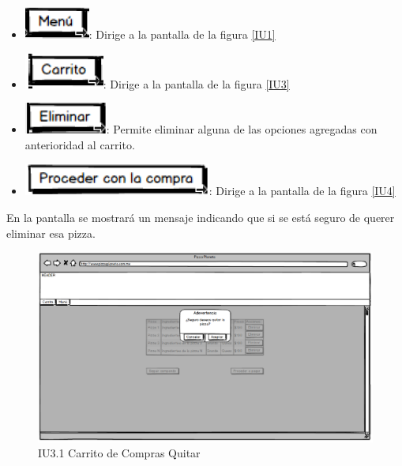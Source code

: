 \begin{itemize}
	
	\item \includegraphics[scale=0.500]{imagenes/iconografia/Menu.png}: Dirige a la pantalla de la figura \ref{IU1}
	\item \includegraphics[scale=0.500]{imagenes/iconografia/Carrito.png}: Dirige a la pantalla de la figura \ref{IU3}
	\item \includegraphics[scale=0.500]{imagenes/iconografia/Eliminar.png}: Permite eliminar alguna de las opciones agregadas con anterioridad al carrito.
	\item \includegraphics[scale=0.500]{imagenes/iconografia/Proceder.png}: Dirige a la pantalla de la figura \ref{IU4}
	
\end{itemize}

	En la pantalla se mostrará un mensaje indicando que si se está seguro de querer eliminar esa pizza.
	
	
	\begin{figure}[h]
		
		\begin{center}				
			
			\includegraphics[scale=0.50]{imagenes/IUs/RegistroSolicitantes/iu1-IniciarSesion/IU3-1CarritoDeComprasQuitar.png}
			\caption{IU3.1 Carrito de Compras Quitar}
			\label{IU3.1}
			
		\end{center}
		
	\end{figure}
	
